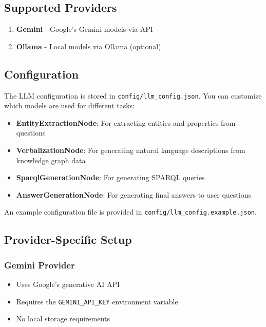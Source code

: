 \subsection*{Supported Providers}

\begin{enumerate}
    \item \textbf{Gemini} - Google's Gemini models via API
    \item \textbf{Ollama} - Local models via Ollama (optional)
\end{enumerate}

\subsection*{Configuration}

The LLM configuration is stored in \texttt{config/llm\_config.json}. You can customize which models are used for different tasks:

\begin{itemize}
    \item \textbf{EntityExtractionNode}: For extracting entities and properties from questions
    \item \textbf{VerbalizationNode}: For generating natural language descriptions from knowledge graph data
    \item \textbf{SparqlGenerationNode}: For generating SPARQL queries
    \item \textbf{AnswerGenerationNode}: For generating final answers to user questions
\end{itemize}

An example configuration file is provided in \texttt{config/llm\_config.example.json}.

\subsection*{Provider-Specific Setup}

\subsubsection*{Gemini Provider}

\begin{itemize}
    \item Uses Google's generative AI API
    \item Requires the \texttt{GEMINI\_API\_KEY} environment variable
    \item No local storage requirements
\end{itemize}

